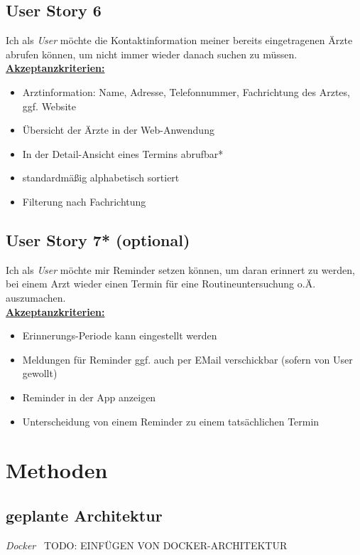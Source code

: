 \documentclass[conference]{IEEEtran}
\begin{document}
\subsection{User Story 6}
Ich als \textit{User} möchte die Kontaktinformation meiner bereits eingetragenen Ärzte abrufen können, um nicht immer wieder danach suchen zu müssen.\\
\underline{\textbf{Akzeptanzkriterien:}}
\begin{itemize}
	\item Arztinformation: Name, Adresse, Telefonnummer, Fachrichtung des Arztes, ggf. Website 
	\item Übersicht der Ärzte in der Web-Anwendung
	\item In der Detail-Ansicht eines Termins abrufbar*
	\item standardmäßig alphabetisch sortiert
	\item Filterung nach Fachrichtung
\end{itemize}

\subsection{User Story 7* (optional)}
Ich als \textit{User} möchte mir Reminder setzen können, um daran erinnert zu werden, bei einem Arzt wieder einen Termin für eine Routineuntersuchung o.Ä. auszumachen.\\
\underline{\textbf{Akzeptanzkriterien:}}
\begin{itemize}
	\item Erinnerungs-Periode kann eingestellt werden
	\item Meldungen für Reminder ggf. auch per EMail verschickbar (sofern von User gewollt)
	\item Reminder in der App anzeigen
	\item Unterscheidung von einem Reminder zu einem tatsächlichen Termin
\end{itemize}

\section{Methoden}
\subsection{geplante Architektur}
\textit{Docker}~\cite{docker}
TODO: EINFÜGEN VON DOCKER-ARCHITEKTUR
\end{document}

